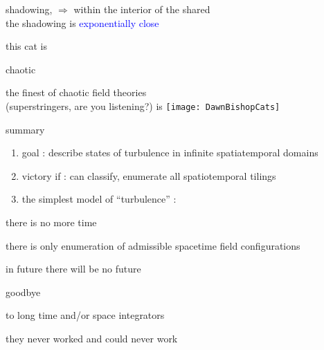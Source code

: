 \begin{frame}{shadowing, \statesp}
$\Rightarrow$ within the interior of the shared \brick \\
the shadowing is \textcolor{blue}{exponentially close}
\end{frame}

\begin{frame}{this cat is}
\vfill
\begin{center}
{\huge chaotic}
\end{center}
\vfill
\end{frame}

\begin{frame}
 {the finest of chaotic field theories \\
  (superstringers, are you listening?) is}
\catlatt\hfill\texttt{[image: DawnBishopCats]}
\end{frame}

\begin{frame}{summary}
\begin{enumerate}
              \item
goal : describe states of turbulence in infinite spatiatemporal domains
              \item
victory if : can classify, enumerate all spatiotemporal tilings
              \item
the simplest model of ``turbulence'' : \catlatt
\end{enumerate}

\vfill

there is no more time

\medskip

there is only enumeration of admissible spacetime field configurations
\end{frame}

\begin{frame}{in future there will be no future}
\begin{center}
{\huge goodbye}
\end{center}

\vfill

to long time and/or space integrators

\medskip

\hfill they never worked and could never work
\end{frame}





